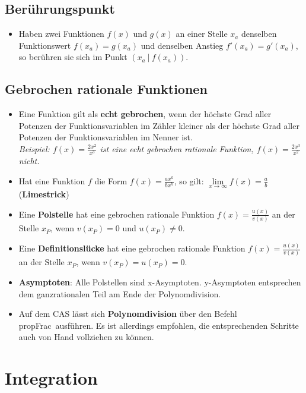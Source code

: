 \subsection{Berührungspunkt}
\begin{itemize}
  \item Haben zwei Funktionen $f(x)$ und $g(x)$ an einer Stelle $x_a$ denselben Funktionswert $f(x_a)=g(x_a)$ und denselben Anstieg $f'(x_a)=g'(x_a)$, so berühren sie sich im Punkt $(x_a~|~f(x_a))$.
\end{itemize}

\subsection{Gebrochen rationale Funktionen}
\begin{itemize}
  \item Eine Funktion gilt als \textbf{echt gebrochen}, wenn der höchste Grad aller Potenzen der Funktionsvariablen im Zähler kleiner als der höchste Grad aller Potenzen der Funktionsvariablen im Nenner ist.\\
  \textit{Beispiel: $f(x)=\frac{2x^2}{x^3}$ ist eine echt gebrochen rationale Funktion, $f(x)=\frac{2x^3}{x^2}$ nicht.}

  \item Hat eine Funktion $f$ die Form $f(x)=\frac{ax^k}{bx^k}$, so gilt: $\lim\limits_{x \rightarrow \infty}f(x)=\frac{a}{b}$ (\textbf{Limestrick})

  \item Eine \textbf{Polstelle} hat eine gebrochen rationale Funktion $f(x)=\frac{u(x)}{v(x)}$ an der Stelle $x_P$, wenn $v(x_P)=0$ und $u(x_P)\neq0$.

  \item Eine \textbf{Definitionslücke} hat eine gebrochen rationale Funktion $f(x)=\frac{u(x)}{v(x)}$ an der Stelle $x_P$, wenn $v(x_P)=u(x_P)=0$.

  \item \textbf{Asymptoten}: Alle Polstellen sind x-Asymptoten. y-Asymptoten entsprechen dem ganzrationalen Teil am Ende der Polynomdivision.

  \item Auf dem CAS lässt sich \textbf{Polynomdivision} über den Befehl \glqq propFrac\grqq~ausführen. Es ist allerdings empfohlen, die entsprechenden Schritte auch von Hand vollziehen zu können.
\end{itemize}

\newpage
\section{Integration}
